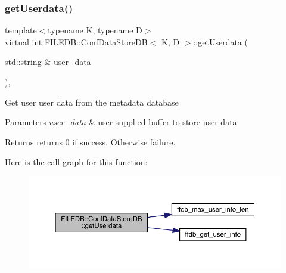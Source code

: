 \subsubsection{\texorpdfstring{getUserdata()}{getUserdata()}\hspace{0.1cm}{\footnotesize\ttfamily [3/3]}}
{\footnotesize\ttfamily template$<$typename K, typename D$>$ \\
virtual int \mbox{\hyperlink{classFILEDB_1_1ConfDataStoreDB}{F\+I\+L\+E\+D\+B\+::\+Conf\+Data\+Store\+DB}}$<$ K, D $>$\+::get\+Userdata (\begin{DoxyParamCaption}\item[{std\+::string \&}]{user\+\_\+data }\end{DoxyParamCaption})\hspace{0.3cm}{\ttfamily [inline]}, {\ttfamily [virtual]}}

Get user user data from the metadata database


\begin{DoxyParams}{Parameters}
{\em user\+\_\+data} & user supplied buffer to store user data \\
\hline
\end{DoxyParams}
\begin{DoxyReturn}{Returns}
returns 0 if success. Otherwise failure. 
\end{DoxyReturn}
Here is the call graph for this function\+:
\nopagebreak
\begin{figure}[H]
\begin{center}
\leavevmode
\includegraphics[width=350pt]{d8/d19/classFILEDB_1_1ConfDataStoreDB_abf7ce0847e1d68f960836826d68c0079_cgraph}
\end{center}
\end{figure}
\mbox{\label{classFILEDB_1_1ConfDataStoreDB_a9917cff27ec340f88e59ddb9be630ecf}} 
